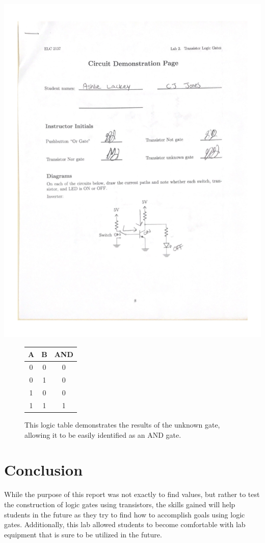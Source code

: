 \documentclass[11pt]{article}
\begin{document}
\begin{center}
	\includegraphics[page = 2, width=1.0\textwidth]{"Circuit Demonstration"}
	
\end{center}

\begin{figure}[ht]\centering
	\begin{tabular}{cc|c}
		\toprule
		A & B & AND \\
		\midrule
		0 & 0 & 0 \\
		0 & 1 & 0 \\
		1 & 0 & 0 \\
		1 & 1 & 1 \\
		\bottomrule
	\end{tabular} 
	
	\caption{ This logic table demonstrates the results of the unknown gate, allowing it to be easily identified as an AND gate.}
\end{figure}

\section*{Conclusion}

While the purpose of this report was not exactly to find values, but rather to test the construction of logic gates using transistors, the skills gained will help students in the future as they try to find how to accomplish goals using logic gates. Additionally, this lab allowed students to become comfortable with lab equipment that is sure to be utilized in the future.
\end{document}
